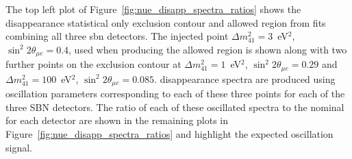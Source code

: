 The top left plot of Figure~\ref{fig:nue_disapp_spectra_ratios} shows the \nue disappearance statistical only exclusion contour and allowed region from fits combining all three \gls{sbn} detectors. The injected point \mbox{$\Delta m^2_{41} = 3$~eV$^2$}, $\sin^2{2\theta_{\mu e}} = 0.4$, used when producing the allowed region is shown along with two further points on the exclusion contour at \mbox{$\Delta m^2_{41} = 1$ eV$^2$}, $\sin^2{2\theta_{\mu e}} = 0.29$ and $\Delta m^2_{41} = 100$~eV$^2$, $\sin^2{2\theta_{\mu e}} = 0.085$. \nue disappearance spectra are produced using oscillation parameters corresponding to each of these three points for each of the three SBN detectors. The ratio of each of these oscillated spectra to the nominal for each detector are shown in the remaining plots in Figure~\ref{fig:nue_disapp_spectra_ratios} and highlight the expected oscillation signal.

